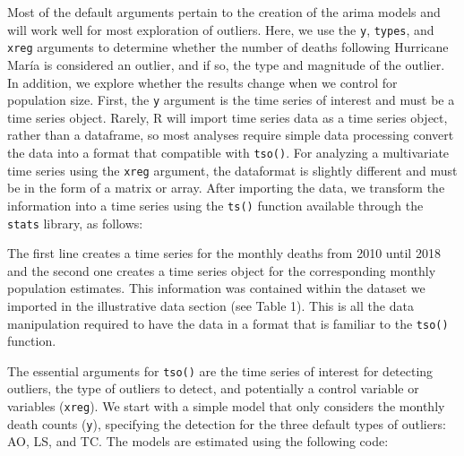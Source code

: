\documentclass[12pt]{article}
\newenvironment{Shaded}{\begin{snugshade}}{\end{snugshade}}
\newcommand{\AttributeTok}[1]{\textcolor[rgb]{0.77,0.63,0.00}{#1}}
\newcommand{\DecValTok}[1]{\textcolor[rgb]{0.00,0.00,0.81}{#1}}
\newcommand{\FunctionTok}[1]{\textcolor[rgb]{0.00,0.00,0.00}{#1}}
\newcommand{\NormalTok}[1]{#1}
\newcommand{\OtherTok}[1]{\textcolor[rgb]{0.56,0.35,0.01}{#1}}
\newcommand{\SpecialCharTok}[1]{\textcolor[rgb]{0.00,0.00,0.00}{#1}}
\begin{document}
Most of the default arguments pertain to the creation of the arima
models and will work well for most exploration of outliers. Here, we use
the \texttt{y}, \texttt{types}, and \texttt{xreg} arguments to determine
whether the number of deaths following Hurricane María is considered an
outlier, and if so, the type and magnitude of the outlier. In addition,
we explore whether the results change when we control for population
size. First, the \texttt{y} argument is the time series of interest and
must be a time series object. Rarely, R will import time series data as
a time series object, rather than a dataframe, so most analyses require
simple data processing convert the data into a format that compatible
with \texttt{tso()}. For analyzing a multivariate time series using the
\texttt{xreg} argument, the dataformat is slightly different and must be
in the form of a matrix or array. After importing the data, we transform
the information into a time series using the \texttt{ts()} function
available through the \texttt{stats} library, as follows:

\begin{Shaded}
\end{Shaded}

The first line creates a time series for the monthly deaths from 2010
until 2018 and the second one creates a time series object for the
corresponding monthly population estimates. This information was
contained within the dataset we imported in the illustrative data
section (see Table 1). This is all the data manipulation required to
have the data in a format that is familiar to the \texttt{tso()}
function.

The essential arguments for \texttt{tso()} are the time series of
interest for detecting outliers, the type of outliers to detect, and
potentially a control variable or variables (\texttt{xreg}). We start
with a simple model that only considers the monthly death counts
(\texttt{y}), specifying the detection for the three default types of
outliers: AO, LS, and TC. The models are estimated using the following
code:
\end{document}
